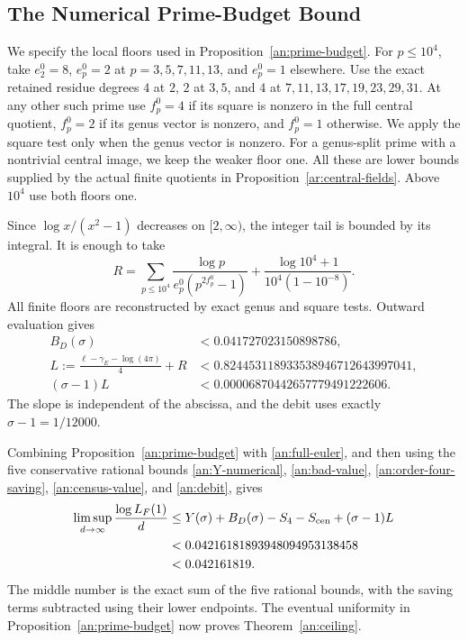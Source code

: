 \subsection{The Numerical Prime-Budget Bound}

We specify the local floors used in Proposition~\ref{an:prime-budget}.
For $p\leq10^4$, take $e_2^0=8$, $e_p^0=2$ at
$p=3,5,7,11,13$, and $e_p^0=1$ elsewhere. Use the exact retained
residue degrees $4$ at $2$, $2$ at $3,5$, and $4$ at
$7,11,13,17,19,23,29,31$. At any other such prime use $f_p^0=4$
if its square is nonzero in the full central quotient, $f_p^0=2$
if its genus vector is nonzero, and $f_p^0=1$ otherwise.
We apply the square test only when the genus vector is nonzero. For a
genus-split prime with a nontrivial central image, we keep the weaker
floor one. All these are lower bounds supplied by the
actual finite quotients in Proposition~\ref{ar:central-fields}.
Above $10^4$ use both floors one.

Since $\log x/(x^2-1)$ decreases on $[2,\infty)$, the integer tail
is bounded by its integral. It is enough to take
\begin{equation}\label{an:R}
 R=\sum_{p\leq10^4}\frac{\log p}{e_p^0(p^{2f_p^0}-1)}
          +\frac{\log10^4+1}{10^4(1-10^{-8})}.
\end{equation}
All finite floors are reconstructed by exact genus and square tests.
Outward evaluation gives
\begin{align}
 B_D(\sigma)&<0.041727023150898786,\label{an:bad-value}\\
 L:=\frac{\ell-\gamma_E-\log(4\pi)}4+R
 &<0.824453118933538946712643997041,\label{an:slope}\\
 (\sigma-1)L&<0.00006870442657779491222606.
 \label{an:debit}
\end{align}
The slope is independent of the abscissa, and the debit uses exactly
$\sigma-1=1/12000$.

Combining Proposition~\ref{an:prime-budget} with
\eqref{an:full-euler}, and then using the five conservative rational
bounds \eqref{an:Y-numerical}, \eqref{an:bad-value},
\eqref{an:order-four-saving}, \eqref{an:census-value}, and
\eqref{an:debit}, gives
\begin{align*}
 \limsup_{d\to\infty}\frac{\log L_F(1)}d
 &\leq Y(\sigma)+B_D(\sigma)-S_4-S_{\rm cen}+(\sigma-1)L\\
 &<0.04216181893948094953138458\\
 &<0.042161819.
\end{align*}
The middle number is the exact sum of the five rational bounds, with
the saving terms subtracted using their lower endpoints. The eventual
uniformity in Proposition~\ref{an:prime-budget} now proves
Theorem~\ref{an:ceiling}.

